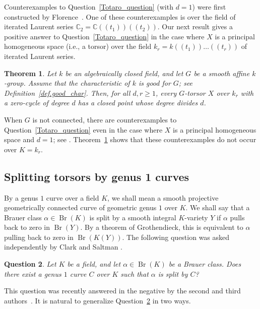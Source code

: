 \documentclass[12pt]{amsart}
\numberwithin{equation}{section}
\newtheorem{theorem}{Theorem}[section]
\newtheorem{question}[theorem]{Question}
\theoremstyle{remark}
\newcommand{\Br}{\operatorname{Br}}
\newcommand{\on}{\operatorname}
\begin{document}
Counterexamples to Question~\ref{Totaro_question} (with $d = 1$) were first constructed by Florence~\cite{florence-zero-cycles}. One of these counterexamples is over the field of iterated Laurent series $\mathbb{C}_2 = \mathbb{C}(\!(t_1)\!)(\!(t_2)\!)$. Our next result gives a positive answer to Question~\ref{Totaro_question} in the case where $X$ is a principal homogeneous space (i.e., a torsor) over the field  $k_r = k(\!(t_1)\!)\dots(\!(t_r)\!)$ of iterated Laurent series.


\begin{theorem}\label{thm.serre_quest}
    Let $k$ be an algebraically closed field, and let $G$ be a smooth affine $k$-group.
    Assume that the characteristic of $k$ is good for $G$; see Definition~\ref{def.good_char}. Then, for all $d,r\geqslant 1$, every $G$-torsor $X$ over $k_r$ with a zero-cycle of degree $d$ has a closed point whose degree divides $d$.
\end{theorem}


When $G$ is not connected, there are counterexamples to Question~\ref{Totaro_question}  even in the case where $X$ is a principal homogeneous space and $d = 1$; see \cite[p.~192]{serre-gc}. Theorem~\ref{thm.serre_quest} shows that these counterexamples do not occur over $K=k_r$.

\subsection{Splitting torsors by genus 1 curves}
	By a genus $1$ curve over a field $K$, we shall mean a smooth projective geometrically connected curve of geometric genus $1$ over $K$. We shall say that a Brauer class $\alpha\in \on{Br}(K)$ is split by a smooth integral $K$-variety $Y$ if $\alpha$ pulls back to zero in $\on{Br}(Y)$. By a theorem of Grothendieck, this is equivalent to $\alpha$ pulling back to zero in $\on{Br}(K(Y))$. The following question was asked independently by Clark \cite{clark2008open} and Saltman \cite{ruozzi2011rage}.
	
	\begin{question} \label{question-clark-saltman}
		Let $K$ be a field, and let $\alpha\in \Br(K)$ be a Brauer class. Does there exist a genus $1$ curve $C$ over $K$ such that $\alpha$ is split by $C$?
	\end{question}

This question was recently answered in the negative by the second and third authors~\cite{genus1}. It is natural to generalize Question~\ref{question-clark-saltman} in two ways. 
\end{document}
